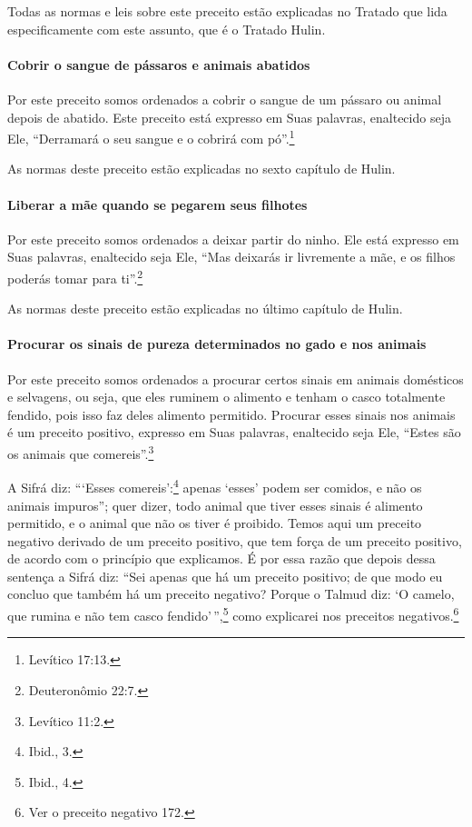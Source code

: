 Todas as normas e leis sobre este preceito estão explicadas no Tratado
que lida especificamente com este assunto, que é o Tratado Hulin.

\paragraph{Cobrir o sangue de pássaros e animais abatidos}

Por este preceito somos ordenados a cobrir o sangue de um pássaro ou
animal depois de abatido. Este preceito está expresso em Suas palavras,
enaltecido seja Ele, ``Derramará o seu sangue e o cobrirá com pó''.\footnote{Levítico 17:13.}

As normas deste preceito estão explicadas no sexto capítulo de Hulin.

\paragraph{Liberar a mãe quando se pegarem seus filhotes}

Por este preceito somos ordenados a deixar partir do ninho. Ele está
expresso em Suas palavras, enaltecido seja Ele, ``Mas deixarás ir
livremente a mãe, e os filhos poderás tomar para ti''.\footnote{Deuteronômio
22:7.}

As normas deste preceito estão explicadas no último capítulo de Hulin.

\paragraph{Procurar os sinais de pureza determinados no gado e nos animais}

Por este preceito somos ordenados a procurar certos sinais em animais
domésticos e selvagens, ou seja, que eles ruminem o alimento e tenham o
casco totalmente fendido, pois isso faz deles alimento permitido.
Procurar esses sinais nos animais é um preceito positivo, expresso em
Suas palavras, enaltecido seja Ele, ``Estes são os animais que
comereis''.\footnote{Levítico 11:2.}

A Sifrá diz: ```Esses comereis':\footnote{Ibid., 3.} apenas `esses' podem ser
comidos, e não os animais impuros''; quer dizer, todo animal que tiver
esses sinais é alimento permitido, e o animal que não os tiver é
proibido. Temos aqui um preceito negativo derivado de um preceito
positivo, que tem força de um preceito positivo, de acordo com o
princípio que explicamos. É por essa razão que depois dessa sentença a
Sifrá diz: ``Sei apenas que há um preceito positivo; de que modo eu
concluo que também há um preceito negativo? Porque o Talmud diz: `O camelo, que rumina e não tem casco fendido'\,'',\footnote{Ibid., 4.}
como explicarei nos preceitos negativos.\footnote{Ver o preceito negativo 172.}

